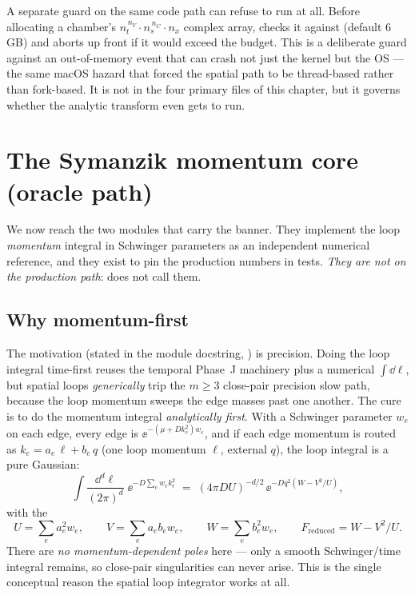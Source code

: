 \begin{gotcha}
A separate guard on the same code path can refuse to run at all. Before
allocating a chamber's $n_t^{\,n_V}\cdot n_s^{\,n_C}\cdot n_x$ complex array,
 checks it against
 (default 6\,GB) and aborts up front if it would
exceed the budget. This is a deliberate guard against an out-of-memory event
that can crash not just the kernel but the OS --- the same macOS hazard that
forced the spatial path to be thread-based rather than fork-based. It is not in
the four primary files of this chapter, but it governs whether the analytic
transform even gets to run.
\end{gotcha}

\section{The Symanzik momentum core (oracle path)}\label{sec:hk-symanzik}

We now reach the two modules that carry the  banner. They
implement the loop \emph{momentum} integral in Schwinger parameters as an
independent numerical reference, and they exist to pin the production
 numbers in tests. \emph{They are not on the production
path}:  does not call them.

\subsection{Why momentum-first}

The motivation (stated in the module docstring,
) is precision. Doing the loop integral
time-first reuses the temporal Phase~J machinery plus a numerical $\int\dd\ell$,
but spatial loops \emph{generically} trip the $m\ge 3$ close-pair precision slow
path, because the loop momentum sweeps the edge masses past one another. The cure
is to do the momentum integral \emph{analytically first}. With a Schwinger
parameter $w_e$ on each edge, every edge is $\ee^{-(\mu + D k_e^{2})w_e}$, and if
each edge momentum is routed as $k_e = a_e\,\ell + b_e\,q$ (one loop momentum
$\ell$, external $q$), the loop integral is a pure Gaussian:
\begin{equation}
  \int \frac{\dd^{d}\ell}{(2\pi)^{d}}\;\ee^{-D\sum_e w_e k_e^{2}}
  \;=\;
  (4\pi D U)^{-d/2}\,\ee^{-D q^{2}(W - V^{2}/U)},
  \label{eq:hk-symanzik1}
\end{equation}
with the 
\[
  U = \sum_e a_e^{2} w_e,\qquad
  V = \sum_e a_e b_e w_e,\qquad
  W = \sum_e b_e^{2} w_e,\qquad
  F_{\text{reduced}} = W - V^{2}/U.
\]
There are \emph{no momentum-dependent poles} here --- only a smooth
Schwinger/time integral remains, so close-pair singularities can never arise.
This is the single conceptual reason the spatial loop integrator works at all.


